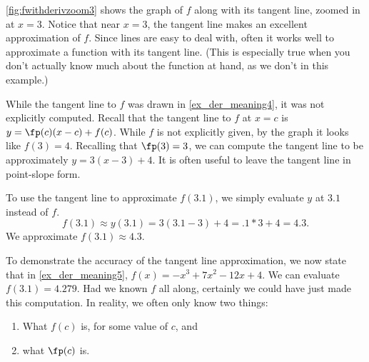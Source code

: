 {\autoref{fig:fwithderivzoom3} shows the graph of $f$ along with its tangent line, zoomed in at $x=3$. Notice that near $x=3$, the tangent line makes an excellent approximation of $f$. Since lines are easy to deal with, often it works well to approximate a function with its tangent line. (This is especially true when you don't actually know much about the function at hand, as we don't in this example.)

While the tangent line to $f$ was drawn in \autoref{ex_der_meaning4}, it was not explicitly computed. Recall that the tangent line to $f$ at $x=c$ is $y = \fp(c)(x-c)+f(c)$. While $f$ is not explicitly given, by the graph it looks like $f(3) = 4$. Recalling that $\fp(3) = 3$, we can compute the tangent line to be approximately $y = 3(x-3)+4.$ It is often useful to leave the tangent line in point-slope form.

To use the tangent line to approximate $f(3.1)$, we simply evaluate $y$ at $3.1$ instead of $f$.
\[f(3.1) \approx y(3.1) = 3(3.1-3)+4 = .1*3+4 = 4.3.\]
We approximate $f(3.1) \approx 4.3.$}

To demonstrate the accuracy of the tangent line approximation, we now state that in \autoref{ex_der_meaning5}, $f(x) = -x^3+7x^2-12x+4$. We can evaluate $f(3.1) = 4.279$. Had we known $f$ all along, certainly we could have just made this computation. In reality, we often only know two things:
\begin{enumerate}
	\item	What $f(c)$ is, for some value of $c$, and
	\item	what $\fp(c)$ is.
\end{enumerate}
	
